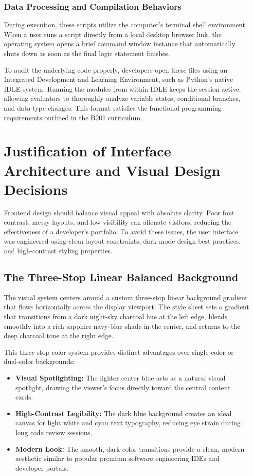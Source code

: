 \documentclass[12pt,a4paper]{article}
\begin{document}
\subsubsection{Data Processing and Compilation Behaviors}
During execution, these scripts utilize the computer's terminal shell environment. When a user runs a script directly from a local desktop browser link, the operating system opens a brief command window instance that automatically shuts down as soon as the final logic statement finishes. 

To audit the underlying code properly, developers open these files using an Integrated Development and Learning Environment, such as Python's native IDLE system. Running the modules from within IDLE keeps the session active, allowing evaluators to thoroughly analyze variable states, conditional branches, and data-type changes. This format satisfies the functional programming requirements outlined in the B201 curriculum.

\section{Justification of Interface Architecture and Visual Design Decisions}
Frontend design should balance visual appeal with absolute clarity. Poor font contrast, messy layouts, and low visibility can alienate visitors, reducing the effectiveness of a developer's portfolio. To avoid these issues, the user interface was engineered using clean layout constraints, dark-mode design best practices, and high-contrast styling properties.

\subsection{The Three-Stop Linear Balanced Background}
The visual system centers around a custom three-stop linear background gradient that flows horizontally across the display viewport. The style sheet sets a gradient that transitions from a dark night-sky charcoal hue at the left edge, blends smoothly into a rich sapphire navy-blue shade in the center, and returns to the deep charcoal tone at the right edge.

This three-stop color system provides distinct advantages over single-color or dual-color backgrounds:
\begin{itemize}
    \item \textbf{Visual Spotlighting:} The lighter center blue acts as a natural visual spotlight, drawing the viewer's focus directly toward the central content cards.
    \item \textbf{High-Contrast Legibility:} The dark blue background creates an ideal canvas for light white and cyan text typography, reducing eye strain during long code review sessions.
    \item \textbf{Modern Look:} The smooth, dark color transitions provide a clean, modern aesthetic similar to popular premium software engineering IDEs and developer portals.
\end{itemize}
\end{document}
